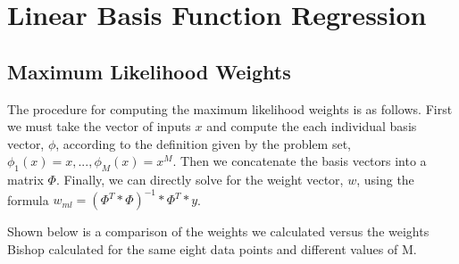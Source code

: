 \documentclass{article}
\begin{document}
\section{Linear Basis Function Regression}

\subsection*{Maximum Likelihood Weights}

The procedure for computing the maximum likelihood weights is as follows. First we must take the vector of inputs $x$ and compute the each individual basis vector, $\phi$, according to the definition given by the problem set, $\phi_1(x) = x, ... , \phi_M(x) = x^M$. Then we concatenate the basis vectors into a matrix $\Phi$. Finally, we can directly solve for the weight vector, $w$, using the formula $w_{ml} = (\Phi^T * \Phi)^{-1} * \Phi^T * y$.

Shown below is a comparison of the weights we calculated versus the weights Bishop calculated for the same eight data points and different values of M.
\end{document}
